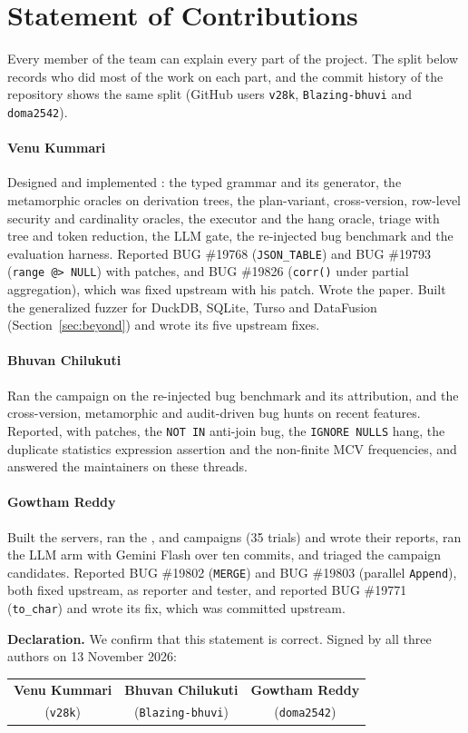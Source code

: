 \section*{Statement of Contributions}
\label{sec:contrib}
Every member of the team can explain every part of the project. The split below
records who did most of the work on each part, and the commit history of the
repository shows the same split (GitHub users \texttt{v28k}, \texttt{Blazing-bhuvi}
and \texttt{doma2542}).

\paragraph{Venu Kummari} Designed and implemented \tool: the typed grammar and
its generator, the metamorphic oracles on derivation trees, the plan-variant,
cross-version, row-level security and cardinality oracles, the executor and the
hang oracle, triage with tree and token reduction, the LLM gate, the re-injected
bug benchmark and the evaluation harness. Reported BUG \#19768
(\texttt{JSON\_TABLE}) and BUG \#19793 (\texttt{range @> NULL}) with patches,
and BUG \#19826 (\texttt{corr()} under partial aggregation), which was fixed
upstream with his patch. Wrote the paper. Built the generalized fuzzer for
DuckDB, SQLite, Turso and DataFusion (Section~\ref{sec:beyond}) and wrote its
five upstream fixes.

\paragraph{Bhuvan Chilukuti} Ran the  campaign on the re-injected bug
benchmark and its attribution, and the cross-version, metamorphic and
audit-driven bug hunts on recent \pg features. Reported, with patches, the
\texttt{NOT IN} anti-join bug, the \texttt{IGNORE NULLS} hang, the duplicate
statistics expression assertion and the non-finite MCV frequencies, and answered
the maintainers on these threads.

\paragraph{Gowtham Reddy} Built the servers, ran the ,  and
 campaigns (35 trials) and wrote their reports, ran the LLM arm with
Gemini Flash over ten commits, and triaged the campaign candidates. Reported BUG
\#19802 (\texttt{MERGE}) and BUG \#19803 (parallel \texttt{Append}), both fixed
upstream, as reporter and tester, and reported BUG \#19771 (\texttt{to\_char})
and wrote its fix, which was committed upstream.

\medskip
\noindent\textbf{Declaration.} We confirm that this statement is correct. Signed by all
three authors on 13 November 2026:\par\smallskip
\noindent\begin{tabular*}{\linewidth}{@{\extracolsep{\fill}}ccc@{}}
\textbf{Venu Kummari} & \textbf{Bhuvan Chilukuti} & \textbf{Gowtham Reddy} \\
(\texttt{v28k}) & (\texttt{Blazing-bhuvi}) & (\texttt{doma2542})
\end{tabular*}
